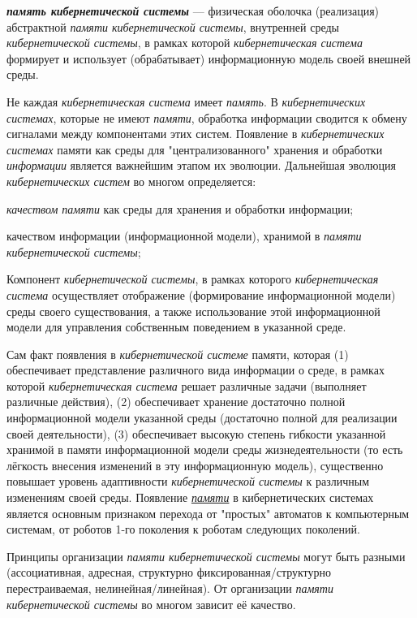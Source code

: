 \textbf{\textit{память кибернетической системы}} --- физическая оболочка (реализация) абстрактной \textit{памяти кибернетической системы}, внутренней среды \textit{кибернетической системы}, в рамках которой \textit{кибернетическая система} формирует и использует (обрабатывает) информационную модель своей внешней среды.

Не каждая \textit{кибернетическая система} имеет \textit{память}. В \textit{кибернетических системах}, которые не имеют \textit{памяти}, обработка информации сводится к обмену сигналами между компонентами этих систем. Появление в \textit{кибернетических системах} памяти как среды для "централизованного"{} хранения и обработки \textit{информации} является важнейшим этапом их эволюции. Дальнейшая эволюция \textit{кибернетических систем} во многом определяется:
\begin{textitemize}
	\item \textit{качеством памяти} как среды для хранения и обработки информации;
	\item качеством информации (информационной модели), хранимой в \textit{памяти кибернетической системы};
\end{textitemize}

Компонент \textit{кибернетической системы}, в рамках которого \textit{кибернетическая система} осуществляет отображение (формирование информационной модели) среды своего существования, а также использование этой информационной модели для управления собственным поведением в указанной среде.

Сам факт появления в \textit{кибернетической системе} памяти, которая (1) обеспечивает представление различного вида информации о среде, в рамках которой \textit{кибернетическая система} решает различные задачи (выполняет различные действия), (2) обеспечивает хранение достаточно полной информационной модели указанной среды (достаточно полной для реализации своей деятельности), (3) обеспечивает высокую степень гибкости указанной хранимой в памяти информационной модели среды жизнедеятельности (то есть лёгкость внесения изменений в эту информационную модель), существенно повышает уровень адаптивности \textit{кибернетической системы} к различным изменениям своей среды.
Появление{} \uline{\textit{памяти}} в кибернетических системах является основным признаком перехода от "простых"{} автоматов к компьютерным системам, от роботов 1-го поколения к роботам следующих поколений.

Принципы организации \textit{памяти кибернетической системы} могут быть разными (ассоциативная, адресная, структурно фиксированная/структурно перестраиваемая, нелинейная/линейная). От организации \textit{памяти кибернетической системы} во многом зависит её качество.

